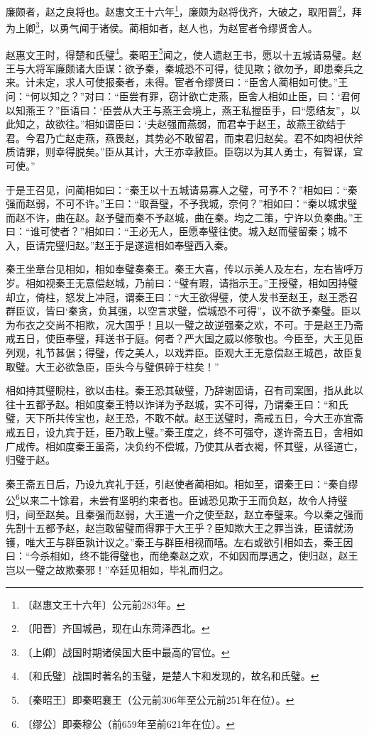 \documentclass[12pt,UTF-8,openany]{ctexbook}
\begin{document}
\begin{normalsize}
    
    廉颇者，赵之良将也。赵惠文王十六年\footnote{〔赵惠文王十六年〕公元前283年。}，廉颇为赵将伐齐，大破之，取阳晋\footnote{〔阳晋〕齐国城邑，现在山东菏泽西北。}，拜为上卿\footnote{〔上卿〕战国时期诸侯国大臣中最高的官位。}，以勇气闻于诸侯。蔺相如者，赵人也，为赵宦者令缪贤舍人。
    
    赵惠文王时，得楚和氏璧\footnote{〔和氏璧〕战国时著名的玉璧，是楚人卞和发现的，故名和氏璧。}。秦昭王\footnote{〔秦昭王〕即秦昭襄王（公元前306年至公元前251年在位）。}闻之，使人遗赵王书，愿以十五城请易璧。赵王与大将军廉颇诸大臣谋：欲予秦，秦城恐不可得，徒见欺；欲勿予，即患秦兵之来。计未定，求人可使报秦者，未得。宦者令缪贤曰：“臣舍人蔺相如可使。”王问：“何以知之？”对曰：“臣尝有罪，窃计欲亡走燕，臣舍人相如止臣，曰：‘君何以知燕王？”臣语曰：‘臣尝从大王与燕王会境上，燕王私握臣手，曰“愿结友”，以此知之，故欲往。”相如谓臣曰：‘夫赵强而燕弱，而君幸于赵王，故燕王欲结于君。今君乃亡赵走燕，燕畏赵，其势必不敢留君，而束君归赵矣。君不如肉袒伏斧质请罪，则幸得脱矣。”臣从其计，大王亦幸赦臣。臣窃以为其人勇士，有智谋，宜可使。”
    
    于是王召见，问蔺相如曰：“秦王以十五城请易寡人之璧，可予不？”相如曰：“秦强而赵弱，不可不许。”王曰：“取吾璧，不予我城，奈何？”相如曰：“秦以城求璧而赵不许，曲在赵。赵予璧而秦不予赵城，曲在秦。均之二策，宁许以负秦曲。”王曰：“谁可使者？”相如曰：“王必无人，臣愿奉璧往使。城入赵而璧留秦；城不入，臣请完璧归赵。”赵王于是遂遣相如奉璧西入秦。
    
    秦王坐章台见相如，相如奉璧奏秦王。秦王大喜，传以示美人及左右，左右皆呼万岁。相如视秦王无意偿赵城，乃前曰：“璧有瑕，请指示王。”王授璧，相如因持璧却立，倚柱，怒发上冲冠，谓秦王曰：“大王欲得璧，使人发书至赵王，赵王悉召群臣议，皆曰‘秦贪，负其强，以空言求璧，偿城恐不可得”，议不欲予秦璧。臣以为布衣之交尚不相欺，况大国乎！且以一璧之故逆强秦之欢，不可。于是赵王乃斋戒五日，使臣奉璧，拜送书于庭。何者？严大国之威以修敬也。今臣至，大王见臣列观，礼节甚倨；得璧，传之美人，以戏弄臣。臣观大王无意偿赵王城邑，故臣复取璧。大王必欲急臣，臣头今与璧俱碎于柱矣！”
    
    相如持其璧睨柱，欲以击柱。秦王恐其破璧，乃辞谢固请，召有司案图，指从此以往十五都予赵。相如度秦王特以诈详为予赵城，实不可得，乃谓秦王曰：“和氏璧，天下所共传宝也，赵王恐，不敢不献。赵王送璧时，斋戒五日，今大王亦宜斋戒五日，设九宾于廷，臣乃敢上璧。”秦王度之，终不可强夺，遂许斋五日，舍相如广成传。相如度秦王虽斋，决负约不偿城，乃使其从者衣褐，怀其璧，从径道亡，归璧于赵。
    
    秦王斋五日后，乃设九宾礼于廷，引赵使者蔺相如。相如至，谓秦王曰：“秦自缪公\footnote{〔缪公〕即秦穆公（前659年至前621年在位）。}以来二十馀君，未尝有坚明约束者也。臣诚恐见欺于王而负赵，故令人持璧归，间至赵矣。且秦强而赵弱，大王遣一介之使至赵，赵立奉璧来。今以秦之强而先割十五都予赵，赵岂敢留璧而得罪于大王乎？臣知欺大王之罪当诛，臣请就汤镬，唯大王与群臣孰计议之。”秦王与群臣相视而嘻。左右或欲引相如去，秦王因曰：“今杀相如，终不能得璧也，而绝秦赵之欢，不如因而厚遇之，使归赵，赵王岂以一璧之故欺秦邪！”卒廷见相如，毕礼而归之。
    

\end{normalsize}
\end{document}
